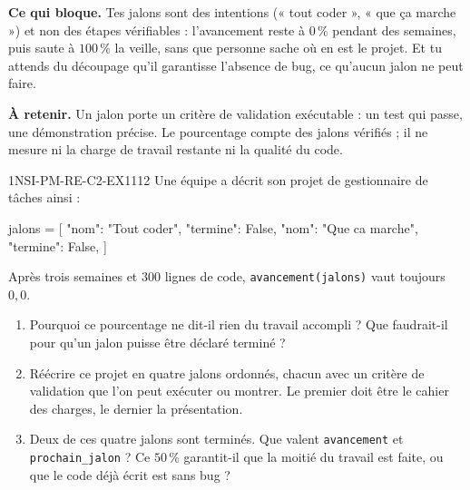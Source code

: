 

\textbf{Ce qui bloque.} Tes jalons sont des intentions (« tout coder », « que ça marche »)
et non des étapes vérifiables : l'avancement reste à $0\,\%$ pendant des semaines, puis
saute à $100\,\%$ la veille, sans que personne sache où en est le projet. Et tu attends du
découpage qu'il garantisse l'absence de bug, ce qu'aucun jalon ne peut faire.

\textbf{À retenir.} Un jalon porte un critère de validation exécutable : un test qui passe,
une démonstration précise. Le pourcentage compte des jalons vérifiés ; il ne mesure ni la
charge de travail restante ni la qualité du code.

\begin{exercice}{1NSI-PM-RE-C2-EX1}{1}{12}
Une équipe a décrit son projet de gestionnaire de tâches ainsi :
\begin{python}
jalons = [
    {"nom": "Tout coder", "termine": False},
    {"nom": "Que ca marche", "termine": False},
]
\end{python}
Après trois semaines et $300$ lignes de code, \lstinline{avancement(jalons)} vaut toujours
$0{,}0$.
\begin{enumerate}
  \item Pourquoi ce pourcentage ne dit-il rien du travail accompli ? Que faudrait-il pour
        qu'un jalon puisse être déclaré terminé ?
  \item Réécrire ce projet en quatre jalons ordonnés, chacun avec un critère de validation
        que l'on peut exécuter ou montrer. Le premier doit être le cahier des charges, le
        dernier la présentation.
  \item Deux de ces quatre jalons sont terminés. Que valent \lstinline{avancement} et
        \lstinline{prochain_jalon} ? Ce $50\,\%$ garantit-il que la moitié du travail est
        faite, ou que le code déjà écrit est sans bug ?
\end{enumerate}
\end{exercice}

